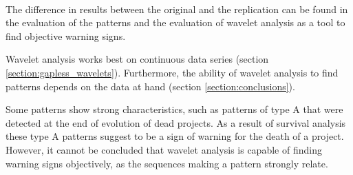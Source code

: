 \paragraph{}
The difference in results between the original and the replication can be found
in the evaluation of the patterns and the evaluation of wavelet analysis as a
tool to find objective warning signs.

Wavelet analysis works best on continuous data series (section
\ref{section:gapless_wavelets}). Furthermore, the ability of wavelet analysis
to find patterns depends on the data at hand (section \ref{section:conclusions}).

Some patterns show strong characteristics, such as patterns of type A that were
detected at the end of evolution of dead projects. As a result of survival
analysis these type A patterns suggest to be a sign of warning for the death
of a project. However, it cannot be concluded that wavelet analysis is capable
of finding warning signs objectively, as the sequences making a pattern
strongly relate.

\begin{comment}
About original study:
- research questions
- participants
- design
- artifacts
- context variables
- summary of results

About replication:
- motivation
- level of interaction with original researchers
- changes to the original experiment

Comparison of results:
- consistent results
- differences in results

Conclude across studies.

\end{comment}